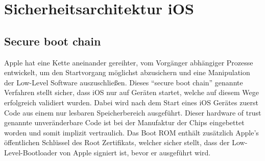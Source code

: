 \section{Sicherheitsarchitektur iOS}
	\subsection{Secure boot chain}
	Apple hat eine Kette aneinander gereihter, vom Vorgänger abhängiger Prozesse
	entwickelt, um den Startvorgang möglichst abzusichern und eine Manipulation
	der Low-Level Software auszuschließen. Dieses "`secure boot chain"'
	genannte Verfahren stellt sicher, dass iOS nur auf Geräten startet, welche
	auf diesem Wege erfolgreich validiert wurden. Dabei wird nach dem Start
	eines iOS Gerätes zuerst Code aus einem nur lesbaren Speicherbereich
	ausgeführt. Dieser hardware of trust genannte unveränderbare Code ist bei
	der Manufaktur der Chips eingebettet worden und somit implizit vertraulich. 
	Das Boot ROM enthält zusätzlich Apple's öffentlichen Schlüssel des Root 
	Zertifikats, welcher sicher stellt, dass der Low-Level-Bootloader von Apple 
	signiert ist, bevor er ausgeführt wird.
	
    
